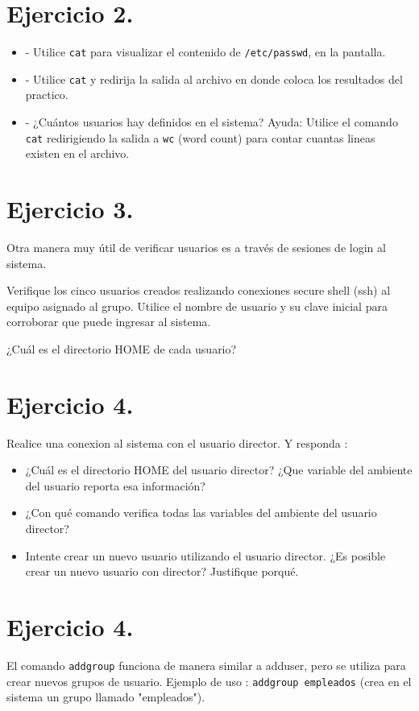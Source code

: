\documentclass[12pt]{article}
\begin{document}
\section{Ejercicio 2.}
\begin{itemize}
\item - Utilice \texttt{cat} para visualizar el contenido de \texttt{/etc/passwd}, en la pantalla.
\item - Utilice \texttt{cat} y redirija la salida al archivo en donde coloca los resultados del practico.
\item - ¿Cuántos usuarios hay definidos en el sistema?
Ayuda: Utilice el comando \texttt{cat} redirigiendo la salida a \texttt{wc} (word count) para contar cuantas lineas
existen en el archivo.
\end{itemize}


\section{Ejercicio 3.}
Otra manera muy útil de verificar usuarios es a través de sesiones de login al sistema.

Verifique los cinco usuarios creados realizando conexiones secure shell (ssh) al equipo asignado al grupo.
Utilice el nombre de usuario y su clave inicial para corroborar que puede ingresar al sistema.

¿Cuál es el directorio HOME de cada usuario?



\section{Ejercicio 4.}
Realice una conexion al sistema con el usuario director.
Y responda :

\begin{itemize}
\item ¿Cuál es el directorio HOME del usuario director? ¿Que variable del ambiente del usuario reporta esa información?
\item ¿Con qué comando verifica todas las variables del ambiente del usuario director?

\item Intente crear un nuevo usuario utilizando el usuario director.
¿Es posible crear un nuevo usuario con director? Justifique porqué.
\end{itemize}



\section{Ejercicio 4.}
El comando \texttt{addgroup} funciona de manera similar a adduser, pero se utiliza para crear nuevos grupos de usuario.
Ejemplo de uso : \texttt{addgroup empleados} (crea en el sistema un grupo llamado "empleados").
\end{document}
